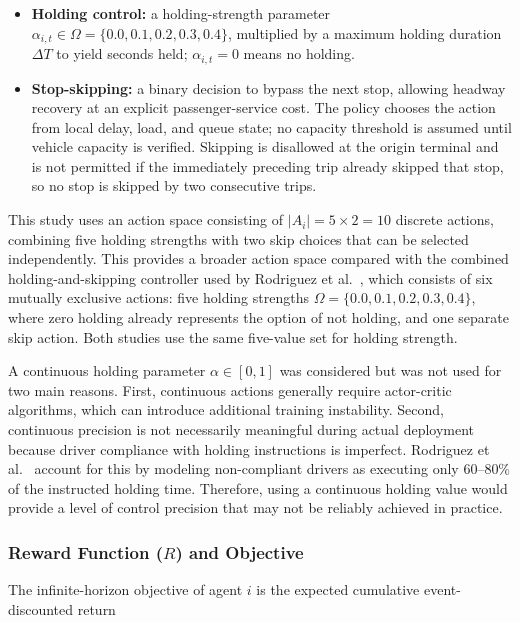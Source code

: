 \begin{itemize}
\item \textbf{Holding control:} a holding-strength parameter $\alpha_{i,t} \in \Omega = \{0.0, 0.1, 0.2, 0.3, 0.4\}$, multiplied by a maximum holding duration $\Delta T$ to yield seconds held; $\alpha_{i,t} = 0$ means no holding.
\item \textbf{Stop-skipping:} a binary decision to bypass the next stop, allowing headway recovery at an explicit passenger-service cost. The policy chooses the action from local delay, load, and queue state; no capacity threshold is assumed until vehicle capacity is verified. Skipping is disallowed at the origin terminal and is not permitted if the immediately preceding trip already skipped that stop, so no stop is skipped by two consecutive trips.
\end{itemize}

This study uses an action space consisting of $|A_i| = 5 \times 2 = 10$ discrete actions, combining five holding strengths with two skip choices that can be selected independently. This provides a broader action space compared with the combined holding-and-skipping controller used by Rodriguez et al.~\cite{Rodriguez2023Cooperative}, which consists of six mutually exclusive actions: five holding strengths $\Omega = \{0.0, 0.1, 0.2, 0.3, 0.4\}$, where zero holding already represents the option of not holding, and one separate skip action. Both studies use the same five-value set for holding strength.

A continuous holding parameter $\alpha \in [0, 1]$ was considered but was not used for two main reasons. First, continuous actions generally require actor-critic algorithms, which can introduce additional training instability. Second, continuous precision is not necessarily meaningful during actual deployment because driver compliance with holding instructions is imperfect. Rodriguez et al.~\cite{Rodriguez2023Cooperative} account for this by modeling non-compliant drivers as executing only 60--80\% of the instructed holding time. Therefore, using a continuous holding value would provide a level of control precision that may not be reliably achieved in practice.

\subsubsection{Reward Function ($R$) and Objective}
\label{subsec:reward}

The infinite-horizon objective of agent $i$ is the expected cumulative event-discounted return

